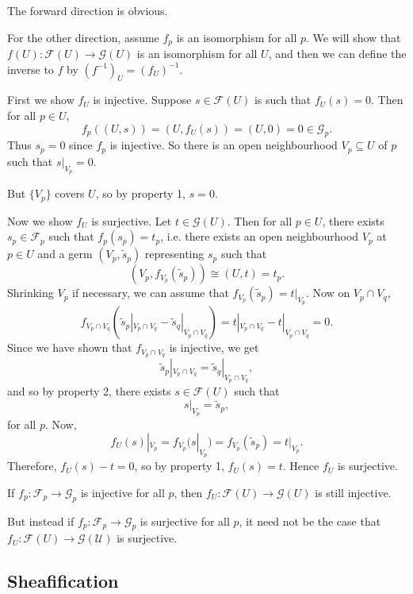 \documentclass[12pt]{article}
\begin{document}
\begin{proofbox}
	The forward direction is obvious.

	For the other direction, assume $f_p$ is an isomorphism for all $p$. We will show that $f(U) : \mathcal{F}(U) \to \mathcal{G}(U)$ is an isomorphism for all $U$, and then we can define the inverse to $f$ by $(f^{-1})_U = (f_U)^{-1}$.

	First we show $f_U$ is injective. Suppose $s \in \mathcal{F}(U)$ is such that $f_U(s) = 0$. Then for all $p \in U$,
	\[
	f_p((U, s)) =  (U, f_U(s)) = (U, 0) = 0 \in \mathcal{G}_p.
	\]
	Thus $s_p = 0$ since $f_p$ is injective. So there is an open neighbourhood $V_p \subseteq U$ of $p$ such that $s|_{V_p} = 0$.

	But $\{V_p\}$ covers $U$, so by property 1, $s = 0$.

	Now we show $f_U$ is surjective. Let $t \in \mathcal{G}(U)$. Then for all $p \in U$, there exists $s_p \in \mathcal{F}_p$ such that $f_p(s_p) = t_p$, i.e. there exists an open neighbourhood $V_p$ at $p \in U$ and a germ $(V_p, \tilde s_p)$ representing $s_p$ such that
	\[
		(V_p, f_{V_p}(\tilde s_p)) \cong (U, t) = t_p.
	\]
	Shrinking $V_p$ if necessary, we can assume that $f_{V_p}(\tilde s_p) = t|_{V_p}$. Now on $V_p \cap V_q$,
	\[
	f_{V_p \cap V_q} (\tilde s_p |_{V_p \cap V_q} - \tilde s_q|_{V_p \cap V_q} ) = t|_{V_p \cap V_q} - t|_{V_p \cap V_q} = 0.
	\]
	Since we have shown that $f_{V_p \cap V_q}$ is injective, we get
	\[
	\tilde s_p |_{V_p \cap V_q} = \tilde s_q|_{V_p \cap V_q},
	\]
	and so by property 2, there exists $s \in \mathcal{F}(U)$ such that
	\[
	s|_{V_p} = \tilde s_p,
	\]
	for all $p$. Now,
	\[
	f_U(s)|_{V_p} = f_{V_p}(s|_{V_p}) = f_{V_p} (\tilde s_p) = t|_{V_p}.
	\]
	Therefore, $f_U(s) - t = 0$, so by property 1, $f_U(s) = t$. Hence $f_U$ is surjective.
\end{proofbox}

\begin{remark}
	If $f_p : \mathcal{F}_p \to \mathcal{G}_p$ is injective for all $p$, then $f_U : \mathcal{F}(U) \to \mathcal{G}(U)$ is still injective.

	But instead if $f_p : \mathcal{F}_p \to \mathcal{G}_p$ is surjective for all $p$, it need not be the case that $f_U : \mathcal{F}(U) \to \mathcal{G(U)}$ is surjective.
\end{remark}

\subsection{Sheafification}%
\label{sub:sfc}
\end{document}
